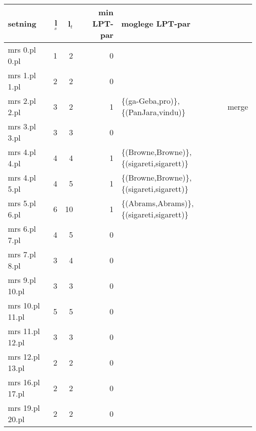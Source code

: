\documentclass[11pt,a4paper,oneside,draft]{book}
\begin{document}
\begin{center}
\begin{tabular}{lrrrll}
 setning          &  l$_s$  &  l$_t$  &  min LPT-par  &  moglege LPT-par                               &          \\
\hline
 mrs 0.pl 0.pl    &      1  &      2  &            0  &                                                &          \\
 mrs 1.pl 1.pl    &      2  &      2  &            0  &                                                &          \\
 mrs 2.pl 2.pl    &      3  &      2  &            1  &  \{(ga-Geba,pro)\}, \{(PanJara,vindu)\}        &  merge   \\
 mrs 3.pl 3.pl    &      3  &      3  &            0  &                                                &          \\
 mrs 4.pl 4.pl    &      4  &      4  &            1  &  \{(Browne,Browne)\}, \{(sigareti,sigarett)\}  &          \\
 mrs 4.pl 5.pl    &      4  &      5  &            1  &  \{(Browne,Browne)\}, \{(sigareti,sigarett)\}  &          \\
 mrs 5.pl 6.pl    &      6  &     10  &            1  &  \{(Abrams,Abrams)\}, \{(sigareti,sigarett)\}  &          \\
 mrs 6.pl 7.pl    &      4  &      5  &            0  &                                                &          \\
 mrs 7.pl 8.pl    &      3  &      4  &            0  &                                                &          \\
 mrs 9.pl 10.pl   &      3  &      3  &            0  &                                                &          \\
 mrs 10.pl 11.pl  &      5  &      5  &            0  &                                                &          \\
 mrs 11.pl 12.pl  &      3  &      3  &            0  &                                                &          \\
 mrs 12.pl 13.pl  &      2  &      2  &            0  &                                                &          \\
 mrs 16.pl 17.pl  &      2  &      2  &            0  &                                                &          \\
 mrs 19.pl 20.pl  &      2  &      2  &            0  &                                                &          \\

\end{tabular}
\end{center}
\end{document}
